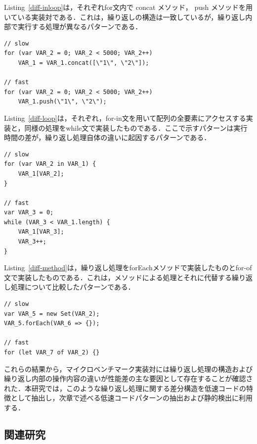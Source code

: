 \documentclass[submit,techrep,noauthor]{ipsj}
\begin{document}
Listing~\ref{diff-inloop}は，それぞれfor文内で concat メソッド， push メソッドを用いている実装対である．これは，繰り返しの構造は一致しているが，繰り返し内部で実行する処理が異なるパターンである．
\begin{lstlisting}[caption=Pairs with differences within the loop, label=diff-inloop, captionpos=t]
// slow
for (var VAR_2 = 0; VAR_2 < 5000; VAR_2++)
    VAR_1 = VAR_1.concat([\"1\", \"2\"]);

// fast
for (var VAR_2 = 0; VAR_2 < 5000; VAR_2++)
    VAR_1.push(\"1\", \"2\");
\end{lstlisting}

Listing~\ref{diff-loop}は，それぞれ，for-in文を用いて配列の全要素にアクセスする実装と，同様の処理をwhile文で実装したものである．ここで示すパターンは実行時間の差が，繰り返し処理自体の違いに起因するパターンである．
\begin{lstlisting}[caption=Pairs with loop differences, label=diff-loop, captionpos=t]
// slow
for (var VAR_2 in VAR_1) {
    VAR_1[VAR_2];
}

// fast
var VAR_3 = 0;
while (VAR_3 < VAR_1.length) {
    VAR_1[VAR_3];
    VAR_3++;
}
\end{lstlisting}

Listing~\ref{diff-method}は，繰り返し処理をforEachメソッドで実装したものとfor-of文で実装したものである．これは，メソッドによる処理とそれに代替する繰り返し処理について比較したパターンである．
\begin{lstlisting}[caption=Pairs of Method and alternative loop, label=diff-method, captionpos=t]
// slow
var VAR_5 = new Set(VAR_2);
VAR_5.forEach(VAR_6 => {});

// fast
for (let VAR_7 of VAR_2) {}
\end{lstlisting}

これらの結果から，マイクロベンチマーク実装対には繰り返し処理の構造および繰り返し内部の操作内容の違いが性能差の主な要因として存在することが確認された．本研究では，このような繰り返し処理に関する差分構造を低速コードの特徴として抽出し，次章で述べる低速コードパターンの抽出および静的検出に利用する．


\subsection{関連研究}
\end{document}
